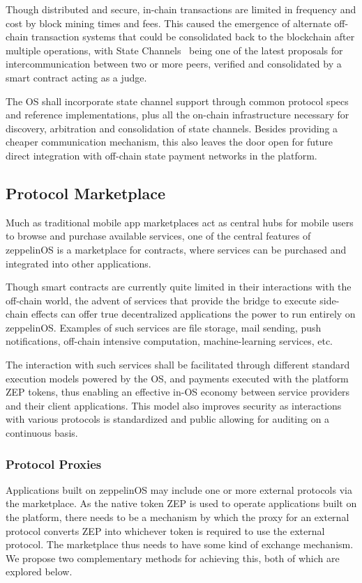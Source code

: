 \documentclass[]{article}
\makeatletter
\DeclareRobustCommand{\_}{%
  \leavevmode\vbox{%
    \hrule\@width.5em
          \@height-.26ex
          \@depth\dimexpr.26ex+.28pt\relax}}
\makeatother
\begin{document}
Though distributed and secure, in-chain transactions are limited in
frequency and cost by block mining times and fees. This caused the
emergence of alternate off-chain transaction systems that could be
consolidated back to the blockchain after multiple operations, with
State Channels~\cite{statechan} being one of the latest proposals for
intercommunication between two or more peers, verified and consolidated
by a smart contract acting as a judge.

The OS shall incorporate state channel support through common protocol
specs and reference implementations, plus all the on-chain
infrastructure necessary for discovery, arbitration and consolidation of
state channels. Besides providing a cheaper communication mechanism,
this also leaves the door open for future direct integration with
off-chain state payment networks in the platform.

\subsection{Protocol Marketplace}

Much as traditional mobile app marketplaces act as central hubs for
mobile users to browse and purchase available services, one of the
central features of zeppelinOS is a marketplace for contracts, where
services can be purchased and integrated into other applications.

Though smart contracts are currently quite limited in their
interactions with the off-chain world, the advent of services that
provide the bridge to execute side-chain effects can offer true
decentralized applications the power to run entirely on zeppelinOS.
Examples of such services are file storage, mail sending, push
notifications, off-chain intensive computation, machine-learning
services, etc.

The interaction with such services shall be facilitated through
different standard execution models powered by the OS, and payments
executed with the platform ZEP tokens, thus enabling an effective
in-OS economy between service providers and their client applications.
This model also improves security as interactions with various protocols
is standardized and public allowing for auditing on a continuous basis.

\subsubsection{Protocol Proxies}

Applications built on zeppelinOS may include one or more external
protocols via the marketplace. As the native token ZEP is used to
operate applications built on the platform, there needs to be a
mechanism by which the proxy for an external protocol converts ZEP into
whichever token is required to use the external protocol. The
marketplace thus needs to have some kind of exchange mechanism. We
propose two complementary methods for achieving this, both of which
are explored below. 
\end{document}
